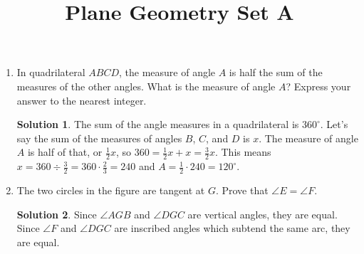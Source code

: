\documentclass{article}
\title{Plane Geometry Set A}
\date{}
\author{}
\theoremstyle{definition}
\newtheorem*{solution}{Solution}
\begin{document}
\maketitle

\begin{multicols}{2}
    \begin{enumerate}
        \item In quadrilateral $ABCD$, the measure of angle $A$ is half the sum of the measures of the other angles.
            What is the measure of angle $A$?
            Express your answer to the nearest integer.
            \begin{solution}
                The sum of the angle measures in a quadrilateral is $360^{\circ}$.
                Let's say the sum of the measures of angles $B$, $C$, and $D$ is $x$.
                The measure of angle $A$ is half of that, or $\frac{1}{2}x$, so $360 = \frac{1}{2}x + x = \frac{3}{2}x$.
                This means $x = 360 \div \frac{3}{2} = 360 \cdot \frac{2}{3} = 240$ and $A = \frac{1}{2} \cdot 240 = 120^{\circ}$.
            \end{solution}
        \item The two circles in the figure are tangent at $G$.
            Prove that $\angle E = \angle F$.
            \begin{center}
            \end{center}
            \begin{solution}
                Since $\angle AGB$ and $\angle DGC$ are vertical angles, they are equal.
                Since $\angle F$ and $\angle DGC$ are inscribed angles which subtend the same arc, they are equal.

\end{solution}
\end{enumerate}
\end{multicols}
\end{document}
